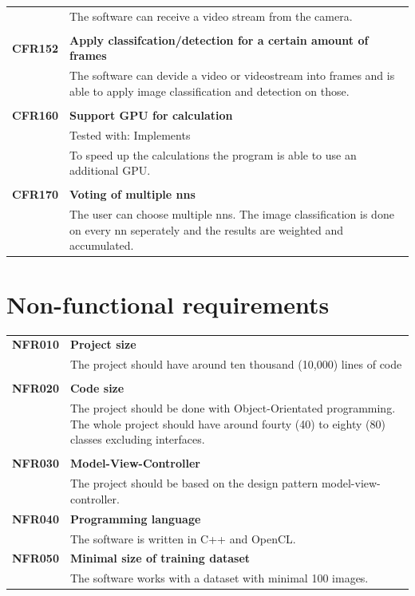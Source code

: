 \documentclass[parskip=full]{scrartcl}
\begin{document}
\begin{tabular}{p{2cm}p{12cm}}
& The software can receive a video stream from the camera.\\
& \\
\textbf{CFR152} & \textbf{Apply classifcation/detection for a certain amount of frames}\\
& The software can devide a video or videostream into frames and is able to apply image classification and detection on those.\\
& \\
\textbf {CFR160} & \textbf{Support GPU for calculation} \\
& Tested with: Implements\\
& To speed up the calculations the program is able to use an additional GPU.\\
& \\
\textbf{CFR170} & \textbf{Voting of multiple \glspl{nn}}\\
& The user can choose multiple \glspl{nn}. The image classification is done on every \gls{nn} seperately and the results are weighted and accumulated.\\

\end{tabular}

\section{Non-functional requirements}
\begin{tabular}{p{2cm}p{12cm}}
\textbf{NFR010} & \textbf{Project size}\\
& The project should have around ten thousand (10,000) lines of code \\
& \\
\textbf{NFR020} & \textbf{Code size}\\
& The project should be done with Object-Orientated programming. The whole project should have around fourty (40) to eighty (80) classes excluding interfaces. \\
& \\
\textbf{NFR030} & \textbf{Model-View-Controller}\\
& The project should be based on the design pattern model-view-controller. \\
\textbf{NFR040} & \textbf{Programming language}\\
& The software is written in C++ and OpenCL.\\
\textbf{NFR050} & \textbf{Minimal size of training dataset}\\
& The software works with a dataset with minimal 100 images.
\end{tabular}
\end{document}
